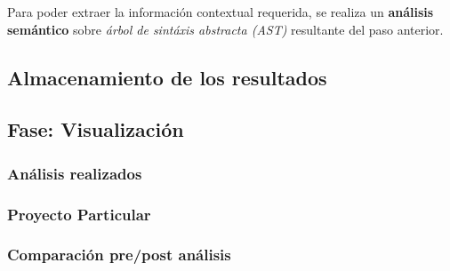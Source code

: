 Para poder extraer la información contextual requerida, se realiza un \textbf{análisis semántico} sobre \textit{árbol de sintáxis abstracta (AST)} resultante del paso anterior.

\subsection{Almacenamiento de los resultados}


\subsection{Fase: Visualización}

\subsubsection{Análisis realizados}
\subsubsection{Proyecto Particular}
\subsubsection{Comparación pre/post análisis}
